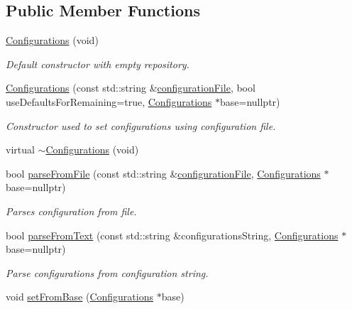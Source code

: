 \subsection*{Public Member Functions}
\begin{DoxyCompactItemize}
\item 
\hyperlink{classel_1_1_configurations_ae299dd1b60a1df9c013cc23029242a77}{Configurations} (void)
\begin{DoxyCompactList}\small\item\em Default constructor with empty repository. \end{DoxyCompactList}\item 
\hyperlink{classel_1_1_configurations_ae341bd647734d1180a5a138222d2f1ea}{Configurations} (const std\+::string \&\hyperlink{classel_1_1_configurations_a18df64bb5cd97bee672160290133141c}{configuration\+File}, bool use\+Defaults\+For\+Remaining=true, \hyperlink{classel_1_1_configurations}{Configurations} $\ast$base=nullptr)
\begin{DoxyCompactList}\small\item\em Constructor used to set configurations using configuration file. \end{DoxyCompactList}\item 
virtual \hyperlink{classel_1_1_configurations_aed56020af78d32cb4d3e4ac73abf3349}{$\sim$\+Configurations} (void)
\item 
bool \hyperlink{classel_1_1_configurations_aaa098126d64a5ee04a3944b1a65dcdca}{parse\+From\+File} (const std\+::string \&\hyperlink{classel_1_1_configurations_a18df64bb5cd97bee672160290133141c}{configuration\+File}, \hyperlink{classel_1_1_configurations}{Configurations} $\ast$base=nullptr)
\begin{DoxyCompactList}\small\item\em Parses configuration from file. \end{DoxyCompactList}\item 
bool \hyperlink{classel_1_1_configurations_af262a41dff665a11889261137b62af4a}{parse\+From\+Text} (const std\+::string \&configurations\+String, \hyperlink{classel_1_1_configurations}{Configurations} $\ast$base=nullptr)
\begin{DoxyCompactList}\small\item\em Parse configurations from configuration string. \end{DoxyCompactList}\item 
void \hyperlink{classel_1_1_configurations_a4c6db218908b39d23cc09b1a16a18e83}{set\+From\+Base} (\hyperlink{classel_1_1_configurations}{Configurations} $\ast$base)

\end{DoxyCompactItemize}
